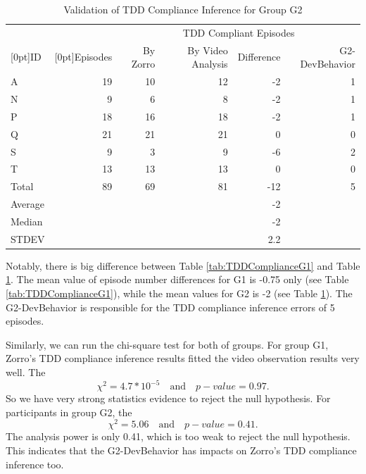 \begin{table}[!ht]
\centering
  \begin{tabular}{|l|r|r|r|r|r|}
  \hline
    &  &  \multicolumn{4}{c|}{TDD Compliant Episodes} \\ \cline{3-6}
    \raisebox{1.5ex}[0pt]{ID} & \raisebox{1.5ex}[0pt]{Episodes}  & 
     By Zorro &  By Video Analysis & Difference & G2-DevBehavior\\ \hline
    A       & 19 &  10   &  12  & -2   & 1 \\ \hline  
    N       &  9 &   6   &   8  & -2   & 1 \\ \hline
    P       & 18 &  16   &  18  & -2   & 1 \\ \hline
    Q       & 21 &  21   &  21  & 0    & 0 \\ \hline
    S       &  9 &   3   &   9  & -6   & 2 \\ \hline
    T       & 13 &  13   &  13  & 0    & 0 \\ \hline
    Total   & 89 &  69   &  81	& -12  & 5 \\ \hline 
    Average &    &       &      & -2   &   \\ \hline
    Median  &    &       &      & -2   &   \\ \hline
    STDEV   &    &       &      & 2.2  &   \\ \hline
  \end{tabular}
  \caption{Validation of TDD Compliance Inference for Group G2}
  \label{tab:TDDComplianceG2} 
\end{table}
Notably, there is big difference between Table \ref{tab:TDDComplianceG1} 
and Table \ref{tab:TDDComplianceG2}. The mean value of 
episode number differences for G1 is -0.75 only
(see Table \ref{tab:TDDComplianceG1}), while the mean values for 
G2 is -2 (see Table \ref{tab:TDDComplianceG2}). 
The G2-DevBehavior is responsible for the TDD compliance inference 
errors of 5 episodes.

Similarly, we can run the chi-square test for both of groups. For
group G1, Zorro's TDD compliance inference results 
fitted the video observation results very well. The
\[
   \chi^2 = 4.7 * 10^{-5} \quad\mbox{and}\quad p-value = 0.97. 
\]
So we have very strong statistics evidence to reject the null
hypothesis. For participants in group G2, the 
\[
   \chi^2 = 5.06 \quad\mbox{and}\quad p-value = 0.41.
\]
The analysis power is only 0.41, which is too weak to reject the
null hypothesis. This indicates that the G2-DevBehavior has 
impacts on Zorro's TDD compliance inference too. 

